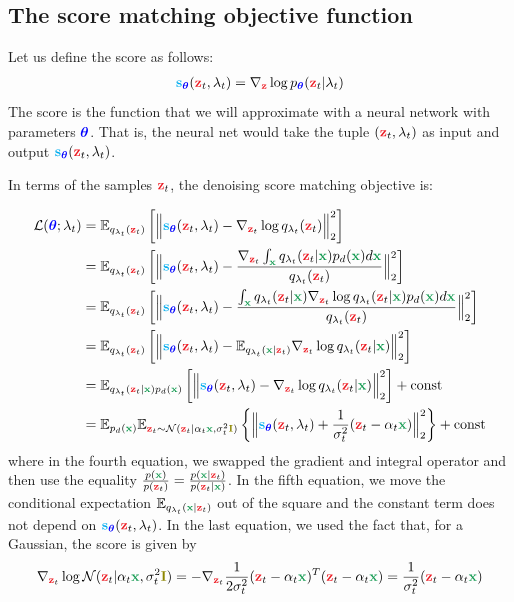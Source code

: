 \documentclass[usenames,dvipsnames]{article}
\DeclarePairedDelimiter{\norm}{\lVert}{\rVert}
\newcommand{\myvec}[1]{\mathbf{#1}}
\newcommand{\myvecsym}[1]{\boldsymbol{#1}}
\newcommand{\vx}{\myvec{\textcolor{ForestGreen}{x}}}
\newcommand{\vz}{\myvec{\textcolor{Red}{z}}}
\newcommand{\vs}{\myvec{\textcolor{Cyan}{s}}}
\newcommand{\vI}{\myvec{\textcolor{olive}{I}}}
\newcommand{\vtheta}{\myvecsym{\textcolor{blue}{\theta}}}
\newcommand{\loss}{{\cal L}}
\newcommand{\gauss}{\mathcal{N}}
\newcommand{\E}{\mathbb{E}} %
\newcommand{\pT}{p_{\vtheta}}
\begin{document}
\subsection{The score matching objective function}

Let us define the score as follows:
\begin{align}
\vs_{\vtheta}(\vz_t,\lambda_t) = \nabla_\vz \log \pT(\vz_t | \lambda_t)
\end{align}
The score is the function that we will approximate with a neural network with parameters $\vtheta$. That is, the neural net would take the tuple $(\vz_t, \lambda_t)$ as input and output $\vs_{\vtheta}(\vz_t,\lambda_t)$.


In terms of the samples $\vz_t$, the denoising score matching objective is:

\begin{align}
  \loss(\vtheta;\lambda_t)
  &= \E_{q_{\lambda_t}(\vz_t)}\left[
    \norm[\Big]{ \vs_{\vtheta}(\vz_t,\lambda_t)
      - \nabla_{\vz_t} \log q_{\lambda_t}(\vz_t)}_2^2  \right] \nonumber \\
  &= \E_{q_{\lambda_t}(\vz_t)}\left[
    \norm[\Big]{ \vs_{\vtheta}(\vz_t,\lambda_t)
      - \frac{
        \nabla_{\vz_t} \int_\vx q_{\lambda_t}(\vz_t|\vx) p_d(\vx) d\vx
      }{
        q_{\lambda_t}(\vz_t)
      }
      }_2^2  \right] \nonumber \\
  &= \E_{q_{\lambda_t}(\vz_t)}\left[
    \norm[\Big]{ \vs_{\vtheta}(\vz_t,\lambda_t)
      - \frac{
        \int_\vx q_{\lambda_t}(\vz_t|\vx) \nabla_{\vz_t} \log q_{\lambda_t}(\vz_t|\vx) p_d(\vx) d\vx
      }{
        q_{\lambda_t}(\vz_t)
      }
      }_2^2  \right] \nonumber  \\      
  &= \E_{q_{\lambda_t}(\vz_t)}\left[
    \norm[\Big]{ \vs_{\vtheta}(\vz_t,\lambda_t)
      - \E_{q_{\lambda_t}(\vx|\vz_t)}
      \nabla_{\vz_t} \log q_{\lambda_t}(\vz_t|\vx)
      }_2^2  \right] \nonumber \\
  &= \E_{q_{\lambda_t}(\vz_t|\vx)p_{d}(\vx)}\left[
    \norm[\Big]{ \vs_{\vtheta}(\vz_t,\lambda_t)
      - \nabla_{\vz_t} \log q_{\lambda_t}(\vz_t|\vx)}_2^2  \right] + \mathrm{const} \nonumber \\
&=
  \E_{p_d(\vx)}
 \E_{\vz_t \sim \gauss(\vz_t|\alpha_t \vx,\sigma_t^2 \vI)}
 \left\{
 \norm[\Big]{\vs_{\vtheta}(\vz_t,\lambda_t)
   + \frac{1}{\sigma_t^2}(\vz_t - \alpha_t\vx) }_2^2 \right\} + \mathrm{const}
\nonumber
\end{align}
where in the fourth equation, we swapped the gradient and integral operator and then use the equality
$
\frac{p(\vx)}{p(\vz_t)} = \frac{p(\vx|\vz_t)}{p(\vz_t|\vx)}
$.
In the fifth equation, we move the conditional expectation $\E_{q_{\lambda_t}(\vx|\vz_t)}$ out of the square and the constant term does not depend on $\vs_{\vtheta}(\vz_t,\lambda_t)$.
In the last equation, we used the fact that, for a Gaussian, the score is given by
\begin{align}
\nabla_{\vz_t} \log \gauss(\vz_t|\alpha_t \vx, \sigma_t^2 \vI)
= -\nabla_{\vz_t} \frac{1}{2\sigma_t^2} (\vz_t - \alpha_t \vx)^{T} (\vz_t - \alpha_t\vx)
= \frac{1}{\sigma_t^2}(\vz_t - \alpha_t\vx)
\nonumber
\end{align}
\end{document}
